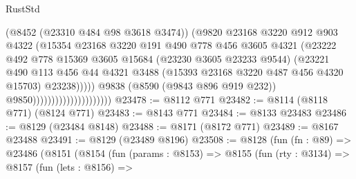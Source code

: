 \begin{lexlean}{RustStd}
\begin{coremodule}
                                                (@8452 (@23310 @484 @98 @3618 @3474))
                                                (@9820
                                                  @23168
                                                  @3220
                                                  @912
                                                  @903
                                                  @4322
                                                  (@15354
                                                    @23168
                                                    @3220
                                                    @191
                                                    @490
                                                    @778
                                                    @456
                                                    @3605
                                                    @4321
                                                    (@23222
                                                      @492
                                                      @778
                                                      @15369
                                                      @3605
                                                      @15684
                                                      (@23230 @3605 @23233 @9544)
                                                      (@23221
                                                        @490
                                                        @113
                                                        @456
                                                        @44
                                                        @4321
                                                        @3488
                                                        (@15393 @23168 @3220 @487 @456 @4320 @15703)
                                                        @23238)))))
                                              @9838
                                              (@8590 (@9843 @896 @919 @232))
                                              @9850)))))))))))))))))))))
@23478 := @8112 @771
@23482 := @8114 (@8118 @771) (@8124 @771)
@23483 := @8143 @771
@23484 := @8133 @23483
@23486 := @8129 (@23484 @8148)
@23488 := @8171 (@8172 @771)
@23489 := @8167 @23488
@23491 := @8129 (@23489 @8196)
@23508 := @8128
    (fun (fn : @89) =>
    @23486
      (@8151
        (@8154
          (fun (params : @8153) =>
          @8155
            (fun (rty : @3134) =>
            @8157
              (fun (lets : @8156) =>

\end{coremodule}
\end{lexlean}

